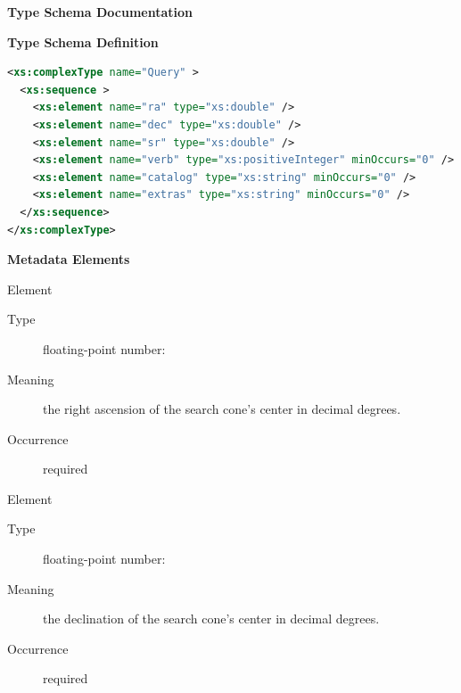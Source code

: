 \documentclass[11pt,a4paper]{ivoa}
\begin{document}
\begin{generated}
\begingroup
      	\renewcommand*\descriptionlabel[1]{%
				\hbox to
5.5em{\emph{#1}\hfil}}\vspace{2ex}\noindent\textbf{ Type
Schema Documentation}


\vspace{1ex}\noindent\textbf{ Type Schema Definition}

\begin{lstlisting}[language=XML,basicstyle=\footnotesize]
<xs:complexType name="Query" >
  <xs:sequence >
    <xs:element name="ra" type="xs:double" />
    <xs:element name="dec" type="xs:double" />
    <xs:element name="sr" type="xs:double" />
    <xs:element name="verb" type="xs:positiveInteger" minOccurs="0" />
    <xs:element name="catalog" type="xs:string" minOccurs="0" />
    <xs:element name="extras" type="xs:string" minOccurs="0" />
  </xs:sequence>
</xs:complexType>
\end{lstlisting}

\vspace{0.5ex}\noindent\textbf{ Metadata Elements}

\begingroup\small\begin{bigdescription}\item[Element \xmlel{ra}]
\begin{description}
\item[Type] floating-point number: 
\item[Meaning] 
                   the right ascension of the search cone's center in
                   decimal degrees.  
               
\item[Occurrence] required

\end{description}
\item[Element \xmlel{dec}]
\begin{description}
\item[Type] floating-point number: 
\item[Meaning] 
                   the declination of the search cone's center in
                   decimal degrees.  
               
\item[Occurrence] required


\end{description}
\end{bigdescription}
\end{generated}
\end{document}

